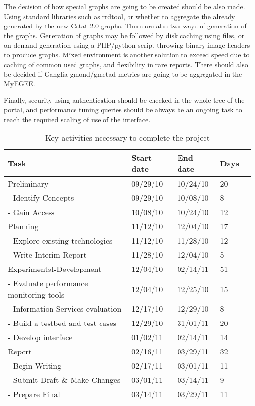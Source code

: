 The decision of how special graphs are going to be created should be also made. Using standard libraries such as rrdtool, or whether to aggregate the already generated by the new Gstat 2.0 graphs. There are also two ways of generation of the graphs. Generation of graphs may be followed by disk caching using files, or on demand generation using a PHP/python script throwing binary image headers to produce graphs. Mixed environment is another solution to exceed speed due to caching of common used graphs, and flexibility in rare reports. There should also be decided if Ganglia gmond/gmetad metrics are going to be aggregated in the MyEGEE. 

Finally, security using authentication should be checked in the whole tree of the portal, and performance tuning queries should be always be an ongoing task to reach the required scaling of use of the interface.

\begin{table}[ht]
\begin{tabular}{ | l | l | l | l | r |}
\hline
Task & Start date & End date & Days \\ \hline
  Preliminary & 09/29/10 & 10/24/10 & 20 \\ \hline 
  -  Identify Concepts & 09/29/10 & 10/08/10 & 8 \\ \hline 
  -  Gain Access & 10/08/10 & 10/24/10 & 12 \\ \hline 
  Planning & 11/12/10 & 12/04/10 & 17 \\ \hline 
  -  Explore existing technologies & 11/12/10 & 11/28/10 & 12 \\ \hline 
  -  Write Interim Report & 11/28/10 & 12/04/10 & 5 \\ \hline 
  Experimental-Development & 12/04/10 & 02/14/11 & 51 \\ \hline 
  -  Evaluate performance monitoring tools & 12/04/10 & 12/25/10 & 15 \\ \hline 
  -  Information Services evaluation & 12/17/10 & 12/29/10 & 8 \\ \hline 
  -  Build a testbed and test cases & 12/29/10 & 31/01/11 & 20 \\ \hline 
  -  Develop interface & 01/02/11 & 02/14/11 & 14 \\ \hline 
  Report & 02/16/11 & 03/29/11 & 32 \\ \hline 
  -  Begin Writing & 02/17/11 & 03/01/11 & 11 \\ \hline 
  -  Submit Draft \& Make Changes & 03/01/11 & 03/14/11 & 9 \\ \hline 
  -  Prepare Final & 03/14/11 & 03/29/11 & 11 \\ \hline 
\end{tabular}
\caption{Key activities necessary to complete the project}
\label{tab:tasks}
\end{table}

